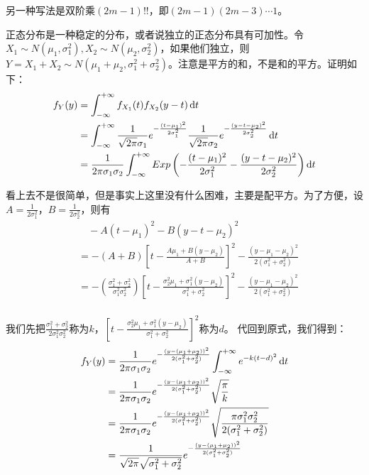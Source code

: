 另一种写法是双阶乘$(2m-1)!!$，即$(2m-1)(2m-3)\cdots1$。

正态分布是一种稳定的分布，或者说独立的正态分布具有可加性。令$X_1\sim N(\mu_1,\sigma_1^2), X_2 \sim N(\mu_2,\sigma_2^2)$，如果他们独立，则$Y=X_1+X_2 \sim N(\mu_1+\mu_2,\sigma_1^2+\sigma_2^2)$。注意是平方的和，不是和的平方。证明如下：
\begin{align*}
f_Y(y)&=\int_{-\infty}^{+\infty}f_{X_1}(t)f_{X_2}(y-t)\mathop{}\!\mathrm{d} t\\
&=\int_{-\infty}^{+\infty}\frac{1}{\sqrt{2\pi}\sigma_1}e^{-\frac{(t-\mu_1)^2}{2\sigma_1^2}} \frac{1}{\sqrt{2\pi}\sigma_2}e^{-\frac{(y-t-\mu_2)^2}{2\sigma_2^2}}\mathop{}\!\mathrm{d} t\\
&=\frac{1}{2\pi\sigma_1\sigma_2}\int_{-\infty}^{+\infty}Exp\left(-\frac{(t-\mu_1)^2}{2\sigma_1^2}-\frac{(y-t-\mu_2)^2}{2\sigma_2^2}\right)\mathop{}\!\mathrm{d} t\\
\end{align*}

看上去不是很简单，但是事实上这里没有什么困难，主要是配平方。为了方便，设$A=\frac{1}{2\sigma_1^2}$，$B=\frac{1}{2\sigma_2^2}$，则有
\begin{align*}
&\quad-A(t-\mu_1)^2-B(y-t-\mu_2)^2\\
&=-(A+B)\left[t-\frac{A\mu_1+B(y-\mu_2)}{A+B} \right]^2 - \frac{(y-\mu_1-\mu_2)^2}{2(\sigma_1^2+\sigma_2^2)}\\
&=-(\frac{\sigma_1^2+\sigma_2^2}{\sigma_1^2\sigma_2^2})\left[t-\frac{\sigma_2^2\mu_1+\sigma_1^2(y-\mu_2)}{\sigma_1^2+\sigma_2^2} \right]^2 - \frac{(y-\mu_1-\mu_2)^2}{2(\sigma_1^2+\sigma_2^2)}\\
\end{align*}

我们先把$\frac{\sigma_1^2+\sigma_2^2}{2\sigma_1^2\sigma_2^2}$称为$k$，$\left[t-\frac{\sigma_2^2\mu_1+\sigma_1^2(y-\mu_2)}{\sigma_1^2+\sigma_2^2} \right]^2$称为$d$。
代回到原式，我们得到：
\begin{align*}
f_Y(y)&=\frac{1}{2\pi\sigma_1\sigma_2}e^{- \frac{(y-(\mu_1+\mu_2))^2}{2(\sigma_1^2+\sigma_2^2)}}\int_{-\infty}^{+\infty}e^{-k(t-d)^2}\mathop{}\!\mathrm{d} t\\
&= \frac{1}{2\pi\sigma_1\sigma_2}e^{- \frac{(y-(\mu_1+\mu_2))^2}{2(\sigma_1^2+\sigma_2^2)}}\sqrt{\frac{\pi}{k}}\\
&= \frac{1}{2\pi\sigma_1\sigma_2}e^{- \frac{(y-(\mu_1+\mu_2))^2}{2(\sigma_1^2+\sigma_2^2)}}\sqrt{\frac{\pi\sigma_1^2\sigma_2^2}{2(\sigma_1^2+\sigma_2^2)}}\\
&= \frac{1}{\sqrt{2\pi}\sqrt{\sigma_1^2+\sigma_2^2}}e^{- \frac{(y-(\mu_1+\mu_2))^2}{2(\sigma_1^2+\sigma_2^2)}}\\
\end{align*}


